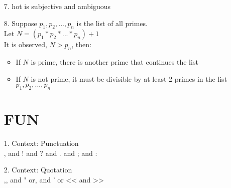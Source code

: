 \documentclass[11pt]{exam}
\begin{document}
\begin{enumerate}[leftmargin=0pt]
\item[7.] hot is subjective and ambiguous

\item[8.] Suppose $p_1, p_2, ..., p_n$ is the list of all primes. \\
Let $N = (p_1 * p_2 * ... * p_n) + 1$ \\
It is observed, $N > p_n$, then:
\begin{itemize}
    \item If $N$ is prime, there is another prime that continues the list
    \item If $N$ is not prime, it must be divisible by at least 2 primes in the list $p_1, p_2, ..., p_n$
\end{itemize}

\section{FUN}
\item[1.] Context: Punctuation \\
, and ! and ? and . and ; and :

\item[2.] Context: Quotation \\
,, and " or, and ' or << and >>

\end{enumerate}
\end{document}
